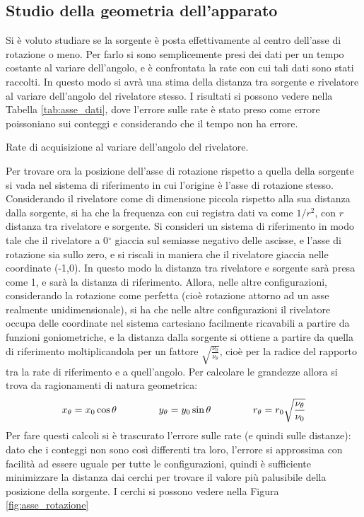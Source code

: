 \subsection{Studio della geometria dell'apparato}
Si è voluto studiare se la sorgente è posta effettivamente al centro dell'asse di rotazione o meno. Per farlo si sono semplicemente presi dei dati per un tempo
costante al variare dell'angolo, e è confrontata la rate con cui tali dati sono stati raccolti. In questo modo si avrà una stima della distanza tra sorgente e
rivelatore al variare dell'angolo del rivelatore stesso. I risultati si possono vedere nella Tabella \ref{tab:asse_dati}, dove l'errore sulle rate è stato preso
come errore poissoniano sui conteggi e considerando che il tempo non ha errore.
%
\begin{table}[h]
	\centering
	
	\caption{Rate di acquisizione al variare dell'angolo del rivelatore.}
	\label{tab:asse_dati}
\end{table}
%
Per trovare ora la posizione dell'asse di rotazione rispetto a quella della sorgente si vada nel sistema di riferimento in cui l'origine è l'asse di rotazione stesso.
Considerando il rivelatore come di dimensione piccola rispetto alla sua distanza dalla sorgente, si ha che la frequenza con cui registra dati va come $1/r^2$, con $r$ distanza
tra rivelatore e sorgente. Si consideri un sistema di riferimento in modo tale che il rivelatore a 0$^\circ$ giaccia sul semiasse negativo delle ascisse, e l'asse di
rotazione sia sullo zero, e si riscali in maniera che il rivelatore giaccia nelle coordinate (-1,0). In questo modo la distanza tra rivelatore e sorgente sarà presa come 1,
e sarà la distanza di riferimento. Allora, nelle altre configurazioni, considerando la rotazione come perfetta (cioè rotazione attorno ad un asse realmente unidimensionale),
si ha che nelle altre configurazioni il rivelatore occupa delle coordinate nel sistema cartesiano facilmente ricavabili a partire da funzioni goniometriche, e la distanza
dalla sorgente si ottiene a partire da quella di riferimento moltiplicandola per un fattore $\sqrt{\frac{\nu_0}{\nu_\theta}}$, cioè per la radice del rapporto tra la rate
di riferimento e a quell'angolo. Per calcolare le grandezze allora si trova da ragionamenti di natura geometrica:
$$ x_\theta = x_0 \cos \theta \hspace{1.5cm} y_\theta = y_0 \sin \theta \hspace{1.5cm} r_\theta = r_0 \sqrt{\frac{\nu_\theta}{\nu_0}}$$
Per fare questi calcoli si è trascurato l'errore sulle rate (e quindi sulle distanze): dato che i conteggi non sono così differenti tra loro, l'errore si approssima con facilità
ad essere uguale per tutte le configurazioni, quindi è sufficiente minimizzare la distanza dai cerchi per trovare il valore più palusibile della posizione della sorgente.
I cerchi si possono vedere nella Figura \ref{fig:asse_rotazione}\\



